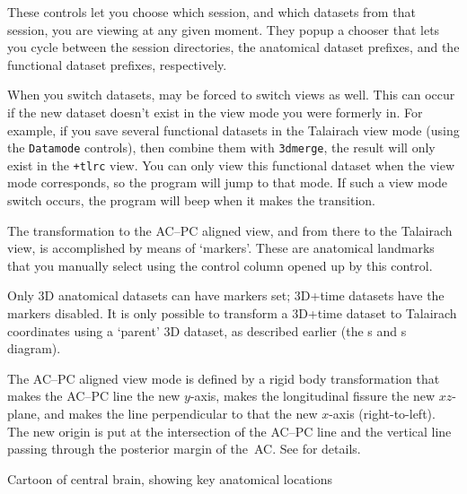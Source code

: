 These controls let you choose which session, and which datasets from
that session, you are viewing at any given moment.  They popup
a chooser that lets you cycle between the session directories,
the anatomical dataset prefixes, and the functional dataset prefixes,
respectively.

When you switch datasets, \afnit may be forced to switch views as
well.  This can occur if the new dataset doesn't exist in the view
mode you were formerly in.  For example, if you save several
functional datasets in the Talairach view mode
(using the {\tt Datamode} controls), then combine them with {\tt 3dmerge},
the result will only exist in the {\tt +tlrc} view.  You can only
view this functional dataset when the view mode corresponds, so the
program will jump to that mode.  If such a view mode switch occurs,
the program will beep when it makes the transition.

The transformation to the AC--PC aligned view, and from there to the
Talairach view, is accomplished by means of `markers'.  These are anatomical
landmarks that you manually select using the control column opened up
by this control.

Only 3D anatomical datasets can have markers set;  3D+time datasets
have the markers disabled.  It is only possible to transform a 3D+time
dataset to Talairach coordinates using a `parent' 3D dataset,
as described earlier (the s and s diagram).

The AC--PC aligned view mode is defined by a rigid body transformation
that makes the AC--PC line the new $y$-axis, makes the longitudinal
fissure the new $xz$-plane, and makes the line perpendicular to that
the new $x$-axis (right-to-left).  The new origin is put at the
intersection of the AC--PC line and the vertical line passing through
the posterior margin of the~AC.  See \cite{Talairach} for details.
\vspace{2ex}\goodbreak\begin{samepage}
\centerline{\epsfxsize=5in}\vspace{1ex}
\centerline{\sf Cartoon of central brain, showing key anatomical locations}
\end{samepage}\goodbreak

